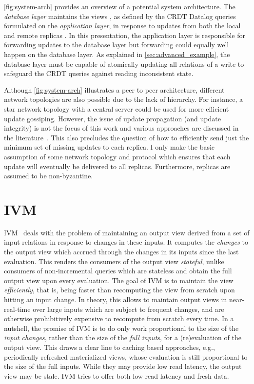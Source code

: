 

\ref{fig:system-arch} provides an overview of a potential system architecture.
The \emph{database layer} maintains the views \deltaO{},
as defined by the \ac{CRDT} Datalog queries formulated on the \emph{application layer},
in response to updates from both the local  and remote replicas
.
In this presentation, the application layer is responsible for forwarding updates
to the database layer but forwarding could equally well happen on the database layer.
As explained in \ref{sec:advanced_example}, the database layer must be capable
of atomically updating all relations of a write to safeguard the \ac{CRDT} queries
against reading inconsistent state.

Although \ref{fig:system-arch} illustrates a peer to peer architecture,
different network topologies are also possible due to the lack of hierarchy.
For instance, a star network topology with a central server could be used
for more efficient update gossiping.
However, the issue of update propagation (and update integrity) is not the focus
of this work and various approaches are discussed in the literature~\cite{
	auvolat2019merkle, sanjuan2020merkle, kleppmann2024bluesky,
	kleppmann2022making}.
This also precludes the question of how to efficiently send just the minimum
set of missing updates to each replica.
I only make the basic assumption of some network topology and protocol
which ensures that each update will eventually be delivered to all replicas.
Furthermore, replicas are assumed to be non-byzantine.

\section{\Acl{IVM}}\label{sec:ivm}

\Acf{IVM}~\cite{gupta1995maintenance} deals with the problem of maintaining
an output view derived from a set of input relations in response to changes
in these inputs.
It computes the \emph{changes} to the output view which accrued through
the changes in its inputs since the last evaluation.
This renders the consumers of the output view \emph{stateful},
unlike consumers of non-incremental queries which are stateless
and obtain the full output view upon every evaluation.
The goal of \ac{IVM} is to maintain the view \emph{efficiently}, that is,
being faster than recomputing the view from scratch upon hitting an input change.
In theory, this allows to maintain output views in near-real-time over large
inputs which are subject to frequent changes, and are otherwise prohibitively
expensive to recompute from scratch every time.
In a nutshell, the promise of \ac{IVM} is to do only work proportional to the
size of the \emph{input changes}, rather than the size of the \emph{full inputs},
for a (re)evaluation of the output view.
This draws a clear line to caching based approaches, e.g., periodically
refreshed materialized views, whose evaluation is still proportional
to the size of the full inputs.
While they may provide low read latency, the output view may be stale.
\ac{IVM} tries to offer both low read latency and fresh data.

